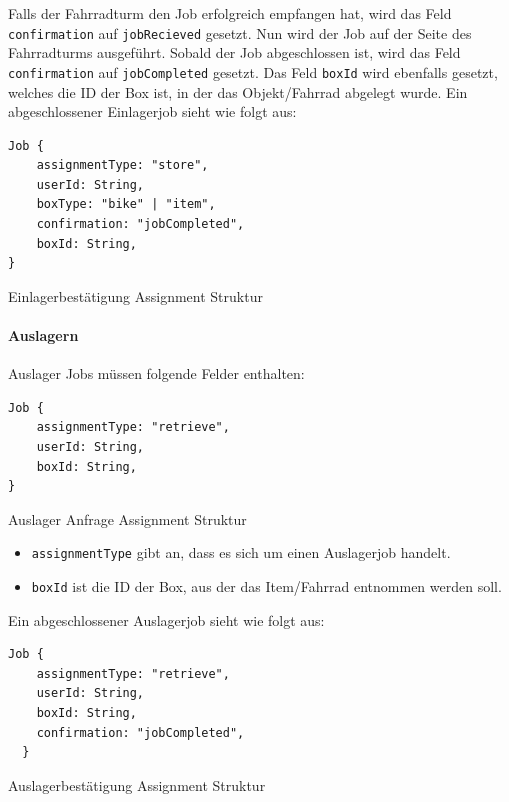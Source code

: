 Falls der Fahrradturm den Job erfolgreich empfangen hat, wird das Feld \texttt{confirmation} auf \texttt{jobRecieved} gesetzt. Nun wird der Job auf der Seite des Fahrradturms ausgeführt. Sobald der Job abgeschlossen ist, wird das Feld \texttt{confirmation} auf \texttt{jobCompleted} gesetzt. Das Feld \texttt{boxId} wird ebenfalls gesetzt, welches die ID der Box ist, in der das Objekt/Fahrrad abgelegt wurde. Ein abgeschlossener Einlagerjob sieht wie folgt aus:

\begin{listing}[H]
  \begin{verbatim}
Job {
    assignmentType: "store",
    userId: String,
    boxType: "bike" | "item",
    confirmation: "jobCompleted",
    boxId: String,
}
\end{verbatim}
  \caption{Einlagerbestätigung Assignment Struktur}
  \label{lst:einlagerbestaetigung_assignment_struktur}
\end{listing}

\paragraph{Auslagern}

Auslager Jobs müssen folgende Felder enthalten:

\begin{listing}[H]
  \begin{verbatim}
Job {
    assignmentType: "retrieve",
    userId: String,
    boxId: String,
}
\end{verbatim}
  \caption{Auslager Anfrage Assignment Struktur}
  \label{lst:auslager_assignment_struktur}
\end{listing}

\begin{itemize}
  \item \texttt{assignmentType} gibt an, dass es sich um einen Auslagerjob handelt.
  \item \texttt{boxId} ist die ID der Box, aus der das Item/Fahrrad entnommen werden soll.
\end{itemize}

Ein abgeschlossener Auslagerjob sieht wie folgt aus:

\begin{listing}[H]
  \begin{verbatim}
Job {
    assignmentType: "retrieve",
    userId: String,
    boxId: String,
    confirmation: "jobCompleted",
  }
\end{verbatim}
  \caption{Auslagerbestätigung Assignment Struktur}
  \label{lst:auslagerbestaetigung_assignment_struktur}
\end{listing}